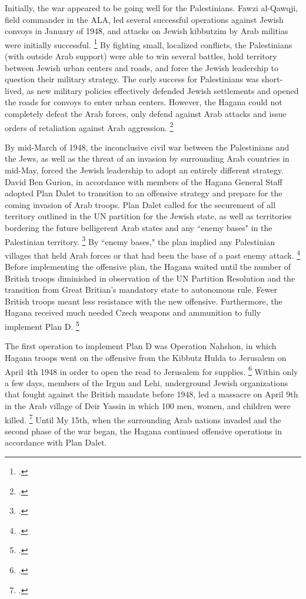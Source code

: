 \documentclass{turabian-researchpaper}
\begin{document}
Initially, the war appeared to be going well for the Palestinians.  Fawzi al-Qawqji, field commander in the ALA, led several successful operations against Jewish convoys in January of 1948, and attacks on Jewish kibbutzim by Arab militias were initially successful.
\footcite[][79]{pappe}
By fighting small, localized conflicts, the Palestinians (with outside Arab support) were able to win several battles, hold territory between Jewish urban centers and roads, and force the Jewish leadership to question their military strategy.  The early success for Palestinians was short-lived, as new military policies effectively defended Jewish settlements and opened the roads for convoys to enter urban centers.  However, the Hagana could not completely defeat the Arab forces, only defend against Arab attacks and issue orders of retaliation against Arab aggression.
\footcite[][68]{tal}

By mid-March of 1948, the inconclusive civil war between the Palestinians and the Jews, as well as the threat of an invasion by surrounding Arab countries in mid-May, forced the Jewish leadership to adopt an entirely different strategy.  David Ben Gurion, in accordance with members of the Hagana General Staff adopted Plan Dalet to transition to an offensive strategy and prepare for the coming invasion of Arab troops.  Plan Dalet called for the securement of all territory outlined in the UN partition for the Jewish state, as well as territories bordering the future belligerent Arab states and any ``enemy bases" in the Palestinian territory.
\footcite{khalidi}
By ``enemy bases," the plan implied any Palestinian villages that held Arab forces or that had been the base of a past enemy attack.
\footcite[][119]{morris}
Before implementing the offensive plan, the Hagana waited until the number of British troops diminished in observation of the UN Partition Resolution and the transition from Great Britian's mandatory state to autonomous rule.  Fewer British troops meant less resistance with the new offensive.  Furthermore, the Hagana received much needed Czech weapons and ammunition to fully implement Plan D.
\footcite[][116]{morris}

The first operation to implement Plan D was Operation Nahshon, in which Hagana troops went on the offensive from the Kibbutz Hulda to Jerusalem on April 4th 1948 in order to open the read to Jerusalem for supplies.
\footcite[][121]{morris}
Within only a few days, members of the Irgun and Lehi, underground Jewish organizations that fought against the British mandate before 1948, led a massacre on April 9th in the Arab village of Deir Yassin in which 100 men, women, and children were killed.
\footcite{nabka}
Until My 15th, when the surrounding Arab nations invaded and the second phase of the war began, the Hagana continued offensive operations in accordance with Plan Dalet.
\end{document}

